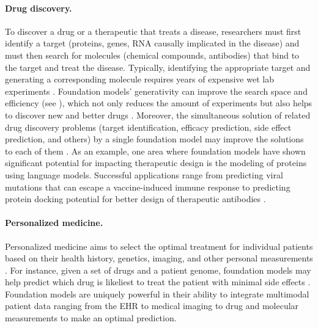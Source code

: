 \paragraph{Drug discovery.}
To discover a drug or a therapeutic that treats a disease, researchers must first identify a target (\eg proteins, genes, RNA causally implicated in the disease) and must then search for molecules (\eg chemical compounds, antibodies) that bind to the target and treat the disease. Typically, identifying the appropriate target and generating a corresponding molecule requires years of expensive wet lab experiments \citep{hughes2011principles, schenone2013target, schneider2018automating}. Foundation models' generativity can improve the search space and efficiency (see ), which not only reduces the amount of experiments but also helps to discover new and better drugs \citep{jin2018junction, you2018graph,walters2020applications, stokes2020deep}. Moreover, the simultaneous solution of related drug discovery problems (\ie target identification, efficacy prediction, side effect prediction, and others) by a single foundation model may improve the solutions to each of them \citep{ramsundar2015massively, camacho2018next, duran2020extending, huang2021therapeutics}. As an example, one area where foundation models have shown significant potential for impacting therapeutic design is the modeling of proteins using language models. Successful applications range from predicting viral mutations that can escape a vaccine-induced immune response to predicting protein docking potential for better design of therapeutic antibodies \citep{bepler2021learning, hie2021learning, tsaban2021harnessing, wu2021protein, rives2021}.


\paragraph{Personalized medicine.}
Personalized medicine aims to select the optimal treatment for individual patients based on their health history, genetics, imaging, and other personal measurements \citep{collins2015new, ashley2016towards}.
For instance, given a set of drugs and a patient genome, foundation models may help predict which drug is likeliest to treat the patient with minimal side effects \citep{whirl2012pharmacogenomics, tatonetti2012data, gerstung2017precision, grinfeld2018classification, adam2020machine}. Foundation models are uniquely powerful in their ability to integrate multimodal patient data ranging from the EHR \citep{rajkomar2018scalable} to medical imaging \citep{bera2019artificial,ouyang2020video} to drug and molecular measurements \citep{gottlieb2011predict, ruiz2020identification} to make an optimal prediction.

